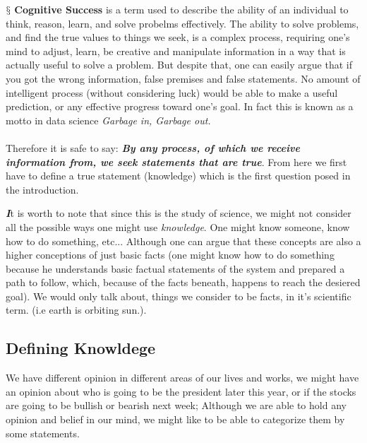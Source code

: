 \documentclass[10pt,a4paper]{article}
\newenvironment{callout}
	{\begin{calloutbox}\color{charcoal}\textbf\textit}
	{\end{calloutbox}}
\newcommand{\newpoint}[1]{\indent$\mathsection$ \textbf{#1}}
\begin{document}
                \newpoint{Cognitive Success} is a term used to describe the ability of an individual to think, reason, learn, and solve probelms effectively. The ability to solve problems, and find the true values to things we seek, is a complex process, requiring one's mind to adjust, learn, be creative and manipulate information in a way that is actually useful to solve a problem. But despite that, one can easily argue that if you got the wrong information, false premises and false statements. No amount of intelligent process (without considering luck) would be able to make a useful prediction, or any effective progress toward one's goal. In fact this is known as a motto in data science \textit{Garbage in, Garbage out.}\cite{sep-epistemology}\cite{Clegg2017-ev}
                \\
                \\
                Therefore it is safe to say: \textbf{\textit{By any process, of which we receive information from, we seek statements that are true}}. From here we first have to define a true statement (knowledge) which is the first question posed in the introduction.
                \begin{callout}
                    It is worth to note that since this is the study of science, we might not consider all the possible ways one might use \textit{knowledge}. One might know someone, know how to do something, etc... Although one can argue that these concepts are also a higher conceptions of just basic facts (one might know how to do something because he understands basic factual statements of the system and prepared a path to follow, which, because of the facts beneath, happens to reach the desiered goal). We would only talk about, things we consider to be facts, in it's scientific term. (i.e earth is orbiting sun.).
                \end{callout}
                    \subsection{Defining Knowldege} We have different opinion in different areas of our lives and works, we might have an opinion about who is going to be the president later this year, or if the stocks are going to be bullish or bearish next week; Although we are able to hold any opinion and belief in our mind, we might like to be able to categorize them by some statements.\cite{CW/E}\cite{sep-epistemology}
                    \\
                    \\
\end{document}
